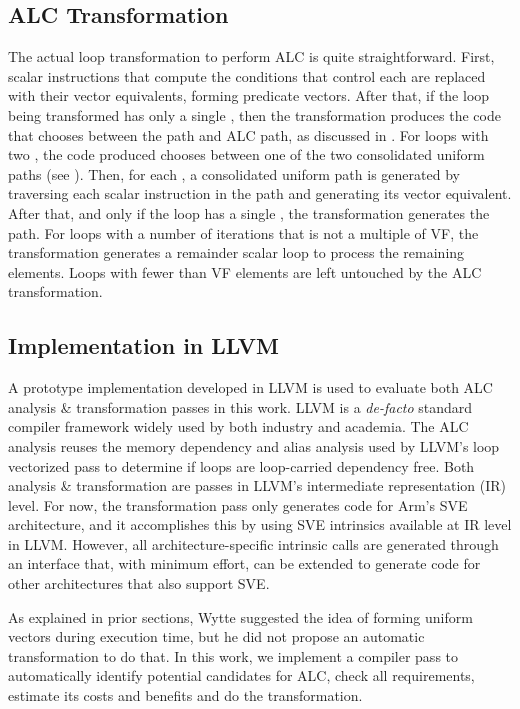 \subsection{ALC Transformation}
\label{sec:alc-transformation}

The actual loop transformation to perform ALC is quite straightforward.
First, scalar instructions that compute the conditions that control each \cpath are replaced with their vector equivalents, forming predicate vectors.
After that, if the loop being transformed has only a single \cpath, then the transformation produces the code that chooses between the \ifconverted path and ALC path, as discussed in .
For loops with two \cpaths, the code produced chooses between one of the two consolidated uniform paths (see ).
Then, for each \cpath, a consolidated uniform path is generated by traversing each scalar instruction in the path and generating its vector equivalent.
After that, and only if the loop has a single \cpath, the transformation generates the \ifconverted path.
For loops with a number of iterations that is not a multiple of VF, the transformation generates a remainder scalar loop to process the remaining elements.
Loops with fewer than VF elements are left untouched by the ALC transformation.

\subsection{Implementation in LLVM}

A prototype implementation developed in LLVM is used to  evaluate both ALC analysis \& transformation passes in this work.
LLVM is a \emph{de-facto} standard compiler framework widely used by both industry and academia.
The ALC analysis reuses the memory dependency and alias analysis used by LLVM's loop vectorized pass to determine if loops are loop-carried dependency free.
Both analysis \& transformation are passes in LLVM's intermediate representation (IR) level.
For now, the transformation pass only generates code for Arm's SVE architecture, and it accomplishes this by using SVE intrinsics available at IR level in LLVM.
However, all architecture-specific intrinsic calls are generated through an interface that, with minimum effort, can be extended to generate code for other architectures that also support SVE.

\iffalse
As explained in prior sections, Wytte suggested the idea of forming uniform vectors during execution time, but he did not propose an automatic transformation to do that. In this work, we implement a compiler pass to automatically identify potential candidates for ALC, check all requirements, estimate its costs and benefits and do the transformation.

